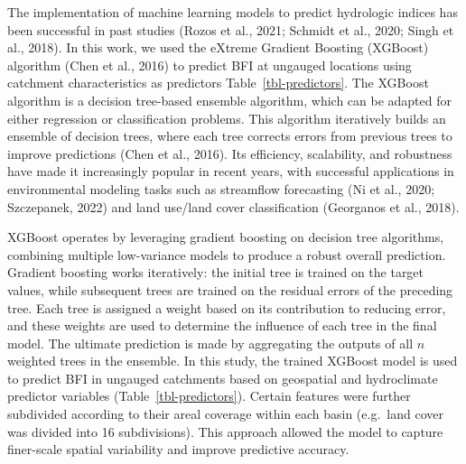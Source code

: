 \documentclass[
]{agujournal2019}
\begin{document}
The implementation of machine learning models to predict hydrologic
indices has been successful in past studies (Rozos et al., 2021; Schmidt
et al., 2020; Singh et al., 2018). In this work, we used the eXtreme
Gradient Boosting (XGBoost) algorithm (Chen et al., 2016) to predict BFI
at ungauged locations using catchment characteristics as predictors
Table~\ref{tbl-predictors}. The XGBoost algorithm is a decision
tree-based ensemble algorithm, which can be adapted for either
regression or classification problems. This algorithm iteratively builds
an ensemble of decision trees, where each tree corrects errors from
previous trees to improve predictions (Chen et al., 2016). Its
efficiency, scalability, and robustness have made it increasingly
popular in recent years, with successful applications in environmental
modeling tasks such as streamflow forecasting (Ni et al., 2020;
Szczepanek, 2022) and land use/land cover classification (Georganos et
al., 2018).

XGBoost operates by leveraging gradient boosting on decision tree
algorithms, combining multiple low-variance models to produce a robust
overall prediction. Gradient boosting works iteratively: the initial
tree is trained on the target values, while subsequent trees are trained
on the residual errors of the preceding tree. Each tree is assigned a
weight based on its contribution to reducing error, and these weights
are used to determine the influence of each tree in the final model. The
ultimate prediction is made by aggregating the outputs of all \(n\)
weighted trees in the ensemble. In this study, the trained XGBoost model
is used to predict BFI in ungauged catchments based on geospatial and
hydroclimate predictor variables (Table~\ref{tbl-predictors}). Certain
features were further subdivided according to their areal coverage
within each basin (e.g.~land cover was divided into 16 subdivisions).
This approach allowed the model to capture finer-scale spatial
variability and improve predictive accuracy.
\end{document}
